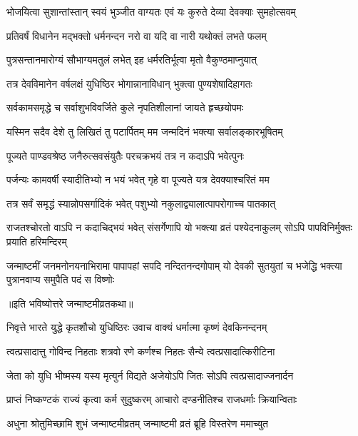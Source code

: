 \twolineshloka
{भोजयित्वा सुशान्तांस्तान् स्वयं भुञ्जीत वाग्यतः}
{एवं यः कुरुते देव्या देवक्याः सुमहोत्सवम्}%


\twolineshloka
{प्रतिवर्षं विधानेन मद्भक्तो धर्मनन्दन}
{नरो वा यदि वा नारी यथोक्तं लभते फलम्}%


\twolineshloka
{पुत्रसन्तानमारोग्यं सौभाग्यमतुलं लभेत्}
{इह धर्मरतिर्भूत्वा मृतो वैकुण्ठमाप्नुयात्}%


\twolineshloka
{तत्र देवविमानेन वर्षलक्षं युधिष्ठिर}
{भोगान्नानाविधान् भुक्त्वा पुण्यशेषादिहागतः}%


\twolineshloka
{सर्वकामसमृद्धे च सर्वाशुभविवर्जिते}
{कुले नृपतिशीलानां जायते हृच्छयोपमः}%


\twolineshloka
{यस्मिन सदैव देशे तु लिखितं तु पटार्पितम्}
{मम जन्मदिनं भक्त्या सर्वालङ्कारभूषितम्}%


\twolineshloka
{पूज्यते पाण्डवश्रेष्ठ जनैरुत्सवसंयुतैः}
{परचक्रभयं तत्र न कदाऽपि भवेत्पुनः}%


\twolineshloka
{पर्जन्यः कामवर्षी स्यादीतिभ्यो न भयं भवेत्}
{गृहे वा पूज्यते यत्र देवक्याश्चरितं मम}%


\twolineshloka
{तत्र सर्वं समृद्धं स्यान्नोपसर्गादिकं भवेत्}
{पशुभ्यो नकुलाद्व्यालात्पापरोगाच्च पातकात्}%

\threelineshloka
{राजतश्चोरतो वाऽपि न कदाचिद्भयं भवेत्}
{संसर्गेणापि यो भक्त्या व्रतं पश्येदनाकुलम्}
{सोऽपि पापविनिर्मुक्तः प्रयाति हरिमन्दिरम्}%

\fourlineindentedshloka
{जन्माष्टमीं जनमनोनयनाभिरामा}
{पापापहां सपदि नन्दितनन्दगोपाम्}
{यो देवकी सुतयुतां च भजेद्धि भक्त्या}
{पुत्रानवाप्य समुपैति पदं स विष्णोः}%

\centerline{॥इति भविष्योत्तरे जन्माष्टमीव्रतकथा॥}




\twolineshloka
{निवृत्ते भारते युद्धे कृतशौचो युधिष्ठिरः}
{उवाच वाक्यं धर्मात्मा कृष्णं देवकिनन्दनम्}%

\twolineshloka
{त्वत्प्रसादात्तु गोविन्द निहताः शत्रवो रणे}
{कर्णश्च निहतः सैन्ये त्वत्प्रसादात्किरीटिना}%

\twolineshloka
{जेता को युधि भीष्मस्य यस्य मृत्युर्न विद्यते}
{अजेयोऽपि जितः सोऽपि त्वत्प्रसादाज्जनार्दन}%

\twolineshloka
{प्राप्तं निष्कण्टकं राज्यं कृत्वा कर्म सुदुष्करम्}
{आचारो दण्डनीतिश्च राजधर्माः क्रियान्विताः}%

\twolineshloka
{अधुना श्रोतुमिच्छामि शुभं जन्माष्टमीव्रतम्}
{जन्माष्टमी व्रतं ब्रूहि विस्तरेण ममाच्युत}%

